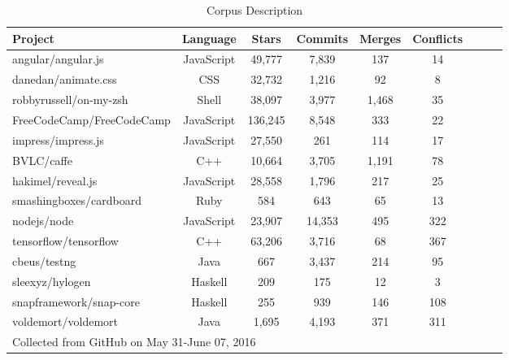 \documentclass{sig-alternate-05-2015}
\begin{document}
\begin{table}[!htbp]
\centering
\caption{Corpus Description}
\begin{tabular}{| l | c | c | c | c | c | c | c | c | } \hline
\toprule
\textbf{Project} & \textbf{Language} & \textbf{Stars} & \textbf{Commits} & \textbf{Merges} & \textbf{Conflicts} \\ \hline
angular/angular.js & JavaScript & 49,777 & 7,839 & 137 & 14 \\ \hline
danedan/animate.css & CSS & 32,732 & 1,216 & 92 & 8 \\ \hline
robbyrussell/on-my-zsh & Shell & 38,097 & 3,977 & 1,468 & 35 \\ \hline
FreeCodeCamp/FreeCodeCamp & JavaScript & 136,245 & 8,548 & 333 & 22 \\ \hline
impress/impress.js & JavaScript & 27,550 & 261 & 114 & 17 \\ \hline
BVLC/caffe & C++ & 10,664 & 3,705 & 1,191 & 78 \\ \hline
hakimel/reveal.js & JavaScript & 28,558 & 1,796 & 217 & 25 \\ \hline
smashingboxes/cardboard & Ruby & 584 & 643 & 65 & 13 \\ \hline
nodejs/node & JavaScript & 23,907 & 14,353 & 495 & 322 \\ \hline
tensorflow/tensorflow & C++ & 63,206 & 3,716 & 68 & 367 \\ \hline
cbeus/testng & Java & 667 & 3,437 & 214 & 95 \\ \hline
sleexyz/hylogen & Haskell & 209 & 175 & 12 & 3 \\ \hline
snapframework/snap-core & Haskell & 255 & 939 & 146 & 108 \\ \hline
voldemort/voldemort & Java & 1,695 & 4,193 & 371 & 311 \\ \hline
\bottomrule
\multicolumn{4}{l}{\footnotesize * Collected from GitHub on May 31-June 07, 2016}\\
\end{tabular}
\label{table:t2}
\end{table}
\end{document}
